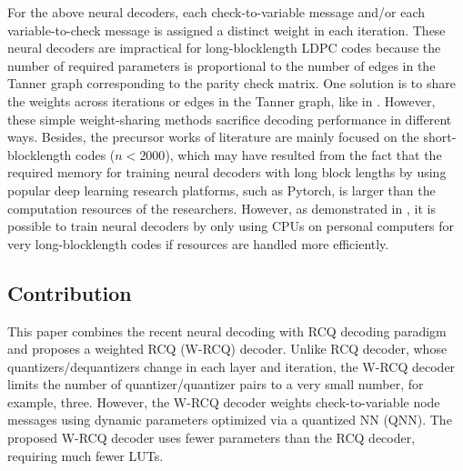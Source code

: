 \documentclass [PhD] {uclathes}
\begin{document}
For the above neural decoders, each check-to-variable message and/or each variable-to-check message is assigned a distinct weight in each iteration.
These neural decoders are impractical for long-blocklength LDPC codes because the number of required parameters is proportional to the number of edges in the Tanner graph corresponding to the parity check matrix.  
One solution is to share the weights across iterations or edges in the Tanner graph, like in \cite{Nachmani2017-qq,Wang2020-fb,Abotabl2019-wt, Lian2019-jh}. However, these simple weight-sharing methods sacrifice decoding performance in different ways.
Besides, the precursor works of literature are mainly focused on the short-blocklength codes ($n<2000$), which may have resulted from the fact that the required memory for training neural decoders with long block lengths by using popular deep learning research platforms, such as Pytorch, is larger than the computation resources of the researchers. 
However, as demonstrated in \cite{Abotabl2019-wt,wang2021ISTC}, it is possible to train neural decoders by only using CPUs on personal computers for very long-blocklength codes if resources are handled more efficiently. 

\subsection{Contribution}
This paper combines the recent neural decoding with RCQ decoding paradigm and proposes a weighted RCQ (W-RCQ) decoder. Unlike RCQ decoder, whose quantizers/dequantizers  change in each layer and iteration, the W-RCQ decoder limits the number of quantizer/quantizer pairs to a very small number, for example, three. However, the W-RCQ decoder weights check-to-variable node messages using dynamic parameters optimized via a quantized NN (QNN). The proposed W-RCQ decoder uses fewer parameters than the RCQ decoder, requiring much fewer LUTs. 
\end{document}
